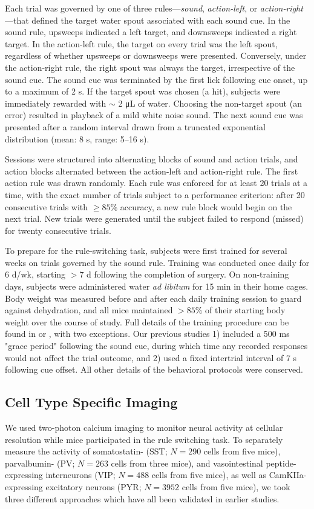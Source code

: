 Each trial was governed by one of three rules---\emph{sound}, \emph{action-left}, or \emph{action-right}---that defined the target water spout associated with each sound cue. In the sound rule, upsweeps indicated a left target, and downsweeps indicated a right target. In the action-left rule, the target on every trial was the left spout, regardless of whether upsweeps or downsweeps were presented. Conversely, under the action-right rule, the right spout was always the target, irrespective of the sound cue. 
The sound cue was terminated by the first lick following cue onset, up to a maximum of 2 s. If the target spout was chosen (a hit), subjects were immediately rewarded with $\sim$ 2 \si{\uL} of water. Choosing the non-target spout (an error) resulted in playback of a mild white noise sound. The next sound cue was presented after a random interval drawn from a truncated exponential distribution (mean: 8 s, range: 5--16 s). 

Sessions were structured into alternating blocks of sound and action trials, and action blocks alternated between the action-left and action-right rule. The first action rule was drawn randomly. Each rule was enforced for at least 20 trials at a time, with the exact number of trials subject to a performance criterion: after 20 consecutive trials with $\geq 85\%$ accuracy, a new rule block would begin on the next trial. New trials were generated until the subject failed to respond (missed) for twenty consecutive trials.

To prepare for the rule-switching task, subjects were first trained for several weeks on trials governed by the sound rule. Training was conducted once daily for 6 d/wk, starting $>7$ d following the completion of surgery. On non-training days, subjects were administered water \emph{ad libitum} for 15 min in their home cages. Body weight was measured before and after each daily training session to guard against dehydration, and all mice maintained $>85\%$ of their starting body weight over the course of study. 
Full details of the training procedure can be found in \cite{siniscalchi2016fast} or \cite{siniscalchi2019enhanced}, with two exceptions. Our previous studies 1) included a 500 ms "grace period" following the sound cue, during which time any recorded responses would not affect the trial outcome, and 2) used a fixed intertrial interval of 7 s following cue offset. All other details of the behavioral protocols were conserved. 

\subsection*{Cell Type Specific Imaging}
We used two-photon calcium imaging to monitor neural activity at cellular resolution while mice participated in the rule switching task. To separately measure the activity of somatostatin- (SST; $N=290$ cells from five mice), parvalbumin- (PV; $N=263$ cells from three mice), and vasointestinal peptide-expressing interneurons (VIP; $N=488$ cells from five mice), as well as CamKIIa-expressing excitatory neurons (PYR; $N=3952$ cells from five mice), we took three different approaches which have all been validated in earlier studies.

